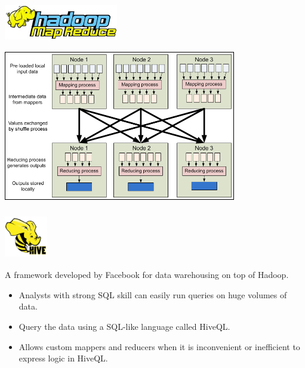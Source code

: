 \documentclass[hyperref={pdfpagelabels=false}]{beamer}
\begin{document}
%
 \begin{frame}
\frametitle{\includegraphics[height=0.60in,
 keepaspectratio=true]{./images/mapreduce-logo.jpg}}
 
 \includegraphics[width=4.0in,
 keepaspectratio=true]{./images/mapreduce-fig1.png}
 
\end{frame}


\begin{frame}
\frametitle{\includegraphics[height=0.7in, 
keepaspectratio=false]{./images/hive.png}}

A framework developed by Facebook for data warehousing on top of Hadoop.
\pause
\begin{itemize}
 \item Analysts with strong SQL skill can easily run queries on huge volumes of
data.
  \pause
 \item Query the data using a SQL-like language called HiveQL.
 \pause
 \item Allows custom mappers and reducers when it is inconvenient or
	inefficient to express logic in HiveQL.
\end{itemize}


\end{frame}
\end{document}
